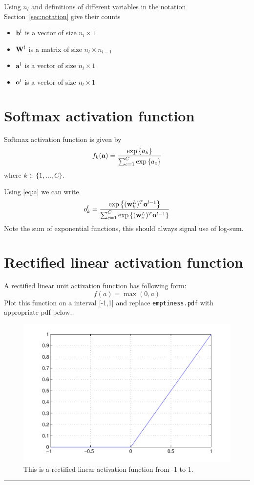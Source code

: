 \documentclass{article}
\begin{document}
 \newproblem{1pt} Using $n_l$ and definitions of different variables in the notation Section~\ref{sec:notation} give their counts
 \begin{itemize}
  \item $\mathbf{b}^l$ is a vector of size $n_l \times 1$
 \item $\mathbf{W}^l$ is a matrix of size $n_l \times n_{l-1}$ 
 \item $\mathbf{a}^l$ is a vector of size $n_l \times 1$
\item $\mathbf{o}^l$ is a vector of size $n_l \times 1$ 
\end{itemize}
\section{Softmax activation function}
Softmax activation function is given by
\begin{equation}
f_k(\mathbf{a}) = \frac{\mathop{\rm exp}\left\{a_k\right\}}{\sum_{c=1}^C \mathop{\rm exp}\left\{a_c\right\}}
\label{eq:softmaxact}
\end{equation}
where $k \in \{1,...,C\}$.

Using \eqref{eq:a} we can write
\begin{equation}
o^l_k = \frac{\mathop{\rm exp}\left\{(\mathbf{w}^L_k)^T\mathbf{o}^{l-1}\right\}}{\sum_{c=1}^C\mathop{\rm exp}\left\{(\mathbf{w}^L_c)^T\mathbf{o}^{l-1}\right\}} \label{eq:softmaxo}
\end{equation}
Note the sum of exponential functions, this should always signal use of log-sum.


\section{Rectified linear activation function}
A rectified linear unit activation function has following form:
\[
f(a) = \max(0, a)
\]
\newproblem{1pt}
Plot this function on a interval [-1,1] and replace \texttt{emptiness.pdf} with appropriate pdf below.
\begin{figure}[H]
\begin{center}
\includegraphics[scale=0.5]{relu.pdf}

\caption{This is a rectified linear activation function from -1 to 1.
\label{fig:relu}}

\end{center}
\end{figure}
\hrule
\end{document}
